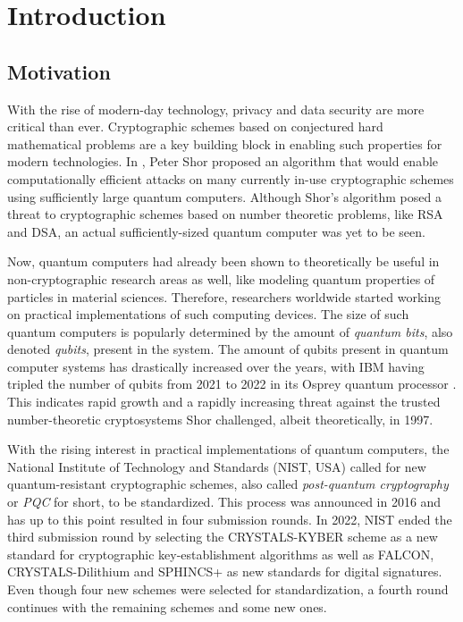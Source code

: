 \chapter{Introduction} \label{sec:intro}
\section{Motivation}
With the rise of modern-day technology, privacy and data security are more critical than ever. Cryptographic schemes based on conjectured hard mathematical problems are a key building block in enabling such properties for modern technologies. In \cite{Shor_1997}, Peter Shor proposed an algorithm that would enable computationally efficient attacks on many currently in-use cryptographic schemes using sufficiently large quantum computers. Although Shor's algorithm posed a threat to cryptographic schemes based on number theoretic problems, like RSA and DSA, an actual sufficiently-sized quantum computer was yet to be seen. 

Now, quantum computers had already been shown to theoretically be useful in non-cryptographic research areas as well, like modeling quantum properties of particles in material sciences. Therefore, researchers worldwide started working on practical implementations of such computing devices. The size of such quantum computers is popularly determined by the amount of \textit{quantum bits}, also denoted \textit{qubits}, present in the system. The amount of qubits present in quantum computer systems has drastically increased over the years, with IBM having tripled the number of qubits from 2021 to 2022 in its Osprey quantum processor \cite{IBM_Osprey}. This indicates rapid growth and a rapidly increasing threat against the trusted number-theoretic cryptosystems Shor challenged, albeit theoretically, in 1997.

With the rising interest in practical implementations of quantum computers, the National Institute of Technology and Standards (NIST, USA) called for new quantum-resistant cryptographic schemes, also called \textit{post-quantum cryptography} or \textit{PQC} for short, to be standardized. This process was announced in 2016 and has up to this point resulted in four submission rounds. In 2022, NIST ended the third submission round by selecting the CRYSTALS-KYBER scheme as a new standard for cryptographic key-establishment algorithms as well as FALCON, CRYSTALS-Dilithium and SPHINCS+ as new standards for digital signatures. Even though four new schemes were selected for standardization, a fourth round continues with the remaining schemes and some new ones. 

